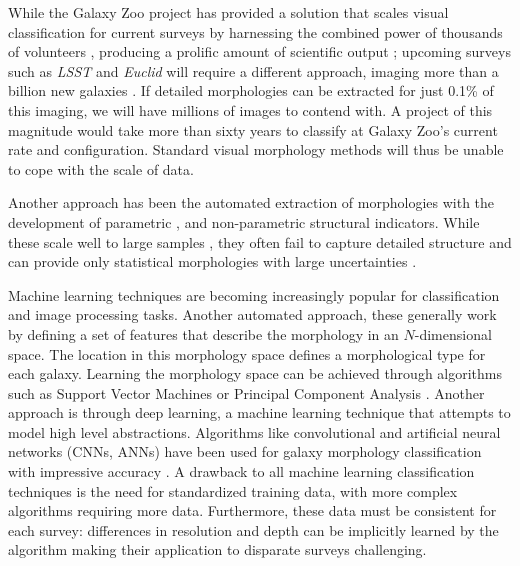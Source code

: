 While the Galaxy Zoo project has provided a solution that scales visual classification 
for current surveys  by harnessing the combined power of thousands of volunteers \citep{Lintott2008, Lintott2011, Willett2013, Willett2017, Simmons2017},
 producing a prolific amount of scientific output \citep[e.g.,][]{Land2008, Bamford2009,
 Darg2010, Schawinski2014, Galloway2015, Smethurst2016}; upcoming surveys such as
 \textit{LSST} and \textit{Euclid} will require a different approach, imaging more than
 a billion new galaxies  \citep{LSST, Euclid}.  If detailed morphologies can be extracted 
for just  0.1\% of this imaging, we will have millions of images to contend with. 
A project of this magnitude would take more than sixty years to classify at 
Galaxy Zoo's current rate and configuration. Standard visual morphology    
methods will thus be unable to cope with the scale of data. 

Another approach has been the automated extraction of morphologies with the
 development of parametric \citep{Sersic1968, Odewahn2002, Peng2002}, 
and non-parametric \citep{Abraham1994, Conselice2003, Abraham2003, Lotz2004,
 Freeman2013} structural indicators. While these scale well to large samples 
\citep[e.g.,][]{Simard2011, 
			Griffith2012, 
			Casteels2014, 
			Holwerda2014, 
			Meert2016}, 
they often fail to capture detailed structure and can provide only statistical morphologies with large uncertainties \cite[e.g.,][]{Abraham1996, Bershady2000}. 



Machine learning techniques are becoming increasingly popular for classification 
and image processing tasks. Another automated approach, these generally work
by defining a set of features that describe the morphology in an $N$-dimensional space. 
The location in this morphology space defines a morphological type for each galaxy.
Learning the morphology space can be achieved through algorithms such as 
Support Vector Machines \citep{HuertasCompany2008} 
or Principal Component Analysis \citep{Watanabe1985, Scarlata2007}.  
Another approach is through deep learning, a machine learning technique that attempts 
to model high level abstractions. Algorithms like convolutional and artificial 
neural networks (CNNs, ANNs) have been used for galaxy morphology classification 
with impressive accuracy 
\citep{Ball2004, 
	Banerji2010, 
	Dieleman2015, 
	HuertasCompany2015}. 
A drawback to all machine learning classification techniques is the need for 
standardized training data, with more complex algorithms requiring more data. 
Furthermore, these data must be consistent for each survey: differences in resolution 
and depth can be implicitly learned by the algorithm making their application to 
disparate surveys challenging.  

